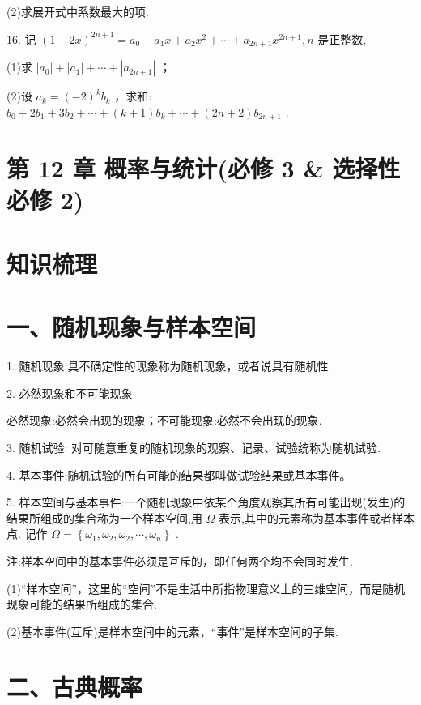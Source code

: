 (2)求展开式中系数最大的项.

16. 记 ${\left( 1 - 2x\right) }^{{2n} + 1} = {a}_{0} + {a}_{1}x + {a}_{2}{x}^{2} + \cdots  + {a}_{{2n} + 1}{x}^{{2n} + 1},n$ 是正整数,

(1)求 $\left| {a}_{0}\right|  + \left| {a}_{1}\right|  + \cdots  + \left| {a}_{{2n} + 1}\right|$ ；

(2)设 ${a}_{k} = {\left( -2\right) }^{k}{b}_{k}$ ，求和: ${b}_{0} + 2{b}_{1} + 3{b}_{2} + \cdots  + \left( {k + 1}\right) {b}_{k} + \cdots  + \left( {{2n} + 2}\right) {b}_{{2n} + 1}$ .

\section*{第 12 章 概率与统计(必修 3 \& 选择性必修 2)}

\section*{知识梳理}

\section*{一、随机现象与样本空间}

1. 随机现象:具不确定性的现象称为随机现象，或者说具有随机性.

2. 必然现象和不可能现象

必然现象:必然会出现的现象；不可能现象:必然不会出现的现象.

3. 随机试验: 对可随意重复的随机现象的观察、记录、试验统称为随机试验.

4. 基本事件:随机试验的所有可能的结果都叫做试验结果或基本事件。

5. 样本空间与基本事件:一个随机现象中依某个角度观察其所有可能出现(发生)的结果所组成的集合称为一个样本空间,用 $\Omega$ 表示,其中的元素称为基本事件或者样本点. 记作 $\Omega  = \left\{  {{\omega }_{1},{\omega }_{2},{\omega }_{2},\cdots ,{\omega }_{n}}\right\}$ .

注:样本空间中的基本事件必须是互斥的，即任何两个均不会同时发生.

(1)“样本空间”，这里的“空间”不是生活中所指物理意义上的三维空间，而是随机现象可能的结果所组成的集合.

(2)基本事件(互斥)是样本空间中的元素，“事件”是样本空间的子集.

\section*{二、古典概率}

